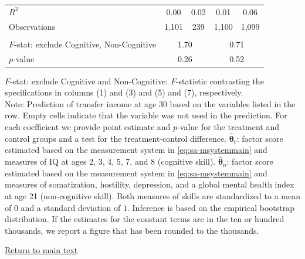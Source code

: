 \documentclass[static]{JJH-Beamer}
\begin{document}
\begin{frame}
\begin{table}[H]
\begin{center}
{\begin{tabular}{lcccccccc}
$R^2$ &         \multicolumn{2}{c}{0.00} &               \multicolumn{2}{c}{0.02} &                \multicolumn{2}{c}{0.01} &             \multicolumn{2}{c}{0.06}   \\
Observations &       \multicolumn{2}{c}{1,101} &              \multicolumn{2}{c}{239}  &       \multicolumn{2}{c}{1,100} &      \multicolumn{2}{c}{1,099}   \\  \\
\midrule
$F$-stat: exclude Cognitive, Non-Cognitive &                \multicolumn{4}{c}{1.70} &                 \multicolumn{4}{c}{0.71}   \\
$p$-value  &                \multicolumn{4}{c}{0.26} &                \multicolumn{4}{c}{0.52}    \\
\bottomrule
\end{tabular}
}
\end{center}
\tiny \flushleft
$F$-stat: exclude Cognitive and Non-Cognitive: $F$-statistic contrasting the specifications in columns (1) and (3) and (5) and (7), respectively.\\
Note: Prediction of transfer income at age 30 based on the variables listed in the row. Empty cells indicate that the variable was not used in the prediction. For each coefficient we provide point estimate and $p$-value for the treatment and control groups and a test for the treatment-control difference. $\hat{\bm{\theta}}_{c}$: factor score estimated based on the measurement system in \eqref{eq:sa-msystemmain} and measures of IQ at ages 2, 3, 4, 5, 7, and 8 (cognitive skill). $\hat{\bm{\theta}}_{n}$: factor score estimated based on the measurement system in \eqref{eq:sa-msystemmain} and measures of somatization, hostility, depression, and a global mental health index at age 21 (non-cognitive skill). Both measures of skills are standardized to a mean of $0$ and a standard deviation of $1$. Inference is based on the empirical bootstrap distribution. If the estimates for the constant terms are in the ten or hundred thousands, we report a figure that has been rounded to the thousands.\\
\end{table}

\end{frame}

\begin{frame}
 \addtocounter{framenumber}{-1}

\begin{center}
\hyperlink{ret:tarttarttart}{\underline{Return to main text}}
\end{center}

\end{frame}
\end{document}

